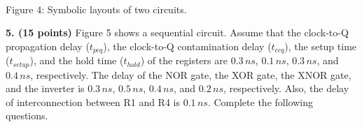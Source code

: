 \documentclass[10pt]{article}
\begin{document}
\begin{center}
\\Figure 4: Symbolic layouts of two circuits.\end{center}\textbf{5. (15 points)} Figure 5 shows a sequential circuit. Assume that the clock-to-Q propagation delay ($t_{pcq}$), the clock-to-Q contamination delay ($t_{ccq}$), the setup time ($t_{setup}$), and the hold time ($t_{hold}$) of the registers are $0.3\,ns$, $0.1\,ns$, $0.3\,ns$, and $0.4\,ns$, respectively. The delay of the NOR gate, the XOR gate, the XNOR gate, and the inverter is $0.3\,ns$, $0.5\,ns$, $0.4\,ns$, and $0.2\,ns$, respectively. Also, the delay of interconnection between R1 and R4 is $0.1\,ns$. Complete the following questions.
\end{document}
